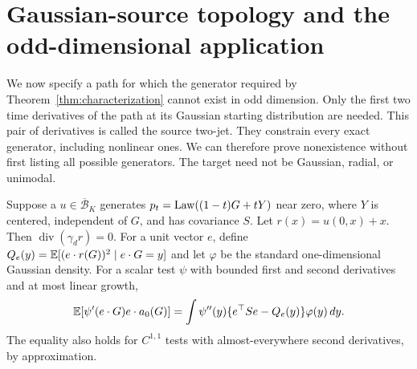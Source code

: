 \section{Gaussian-source topology and the odd-dimensional application}
\label{app:source}

We now specify a path for which the generator required by
Theorem~\ref{thm:characterization} cannot exist in odd dimension.
Only the first two time derivatives of the path at its Gaussian starting
distribution are needed. This pair of derivatives is called the source
two-jet. They constrain every exact generator, including nonlinear ones.
We can therefore prove nonexistence without first listing all possible
generators. The target need not be Gaussian, radial, or unimodal.\AIassistance

\begin{lemma}
\label{lem:twojet}
Suppose a $u\in\overline{\mathcal B}_K$ generates
$p_t=\operatorname{Law}((1-t)G+tY)$ near zero, where $Y$ is centered, independent of
$G$, and has covariance $S$. Let $r(x)=u(0,x)+x$.
Then $\operatorname{div}(\gamma_dr)=0$. For a unit vector $e$, define
$Q_e(y)=\mathbb E[(e\cdot r(G))^2\mid e\cdot G=y]$ and let $\varphi$ be the
standard one-dimensional Gaussian density. For a scalar test $\psi$ with
bounded first and second derivatives and at most linear growth,
\begin{equation}
 \mathbb E[\psi'(e\cdot G)e\cdot a_0(G)]
 =\int\psi''(y)\{e^\top Se-Q_e(y)\}\varphi(y)\,dy.
 \label{eq:twojet-proof}
\end{equation}
The equality also holds for $C^{1,1}$ tests with almost-everywhere second
derivatives, by approximation.
\end{lemma}
